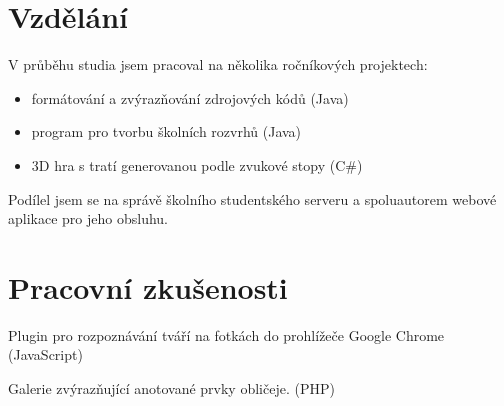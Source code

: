 \documentclass[]{deedy-resume-openfont}
\begin{document}
%
%



\begin{minipage}[t]{0.8\textwidth} 

\sectionsep


\section{Vzdělání} 


\sectionsep

\vspace{\topsep}
\begin{tightemize}
\item V průběhu studia jsem pracoval na několika ročníkových projektech:
    \begin{itemize}
    \item formátování a zvýrazňování zdrojových kódů (Java)
    \item program pro tvorbu školních rozvrhů (Java)
    \item 3D hra s tratí generovanou podle zvukové stopy (C\#)
    \end{itemize}
\item Podílel jsem se na správě školního studentského serveru a spoluautorem webové aplikace pro jeho obsluhu.
\end{tightemize}
\sectionsep

\descript{}
\sectionsep


\section{Pracovní zkušenosti}

\begin{tightemize}
\item Plugin pro rozpoznávání tváří na fotkách do prohlížeče Google Chrome (JavaScript)
\item Galerie zvýrazňující anotované prvky obličeje. (PHP)
\end{tightemize}
\sectionsep



\end{minipage}
\end{document}
